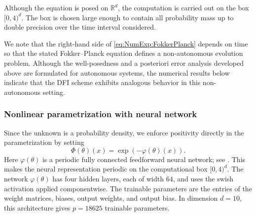 \documentclass[oneside,11pt]{article}
\theoremstyle{remark}
\theoremstyle{thmstyleone}
\theoremstyle{thmstylethree}
\theoremstyle{thmstyletwo}
\newcommand{\R}{\mathbb{R}}
\begin{document}
Although the equation is posed on $\R^d$, the computation is carried out on the box $[0,4)^d$. The box is chosen large enough to contain all probability mass up to double precision over the time interval considered.

We note that the right-hand side of \eqref{eq:NumExp:FokkerPlanck} depends on time so that the stated Fokker--Planck equation defines a non-autonomous evolution problem. Although the well-posedness and a posteriori error analysis developed above are formulated for autonomous systems, the numerical results below indicate that the DFI scheme exhibits analogous behavior in this non-autonomous setting.

\subsubsection{Nonlinear parametrization with neural network}
Since the unknown is a probability density, we enforce positivity directly in the parametrization by setting
\begin{equation*}
    \Phi(\theta)(x)=\exp(-\varphi(\theta)(x)).
\end{equation*}
Here $\varphi(\theta)$ is a periodic fully connected feedforward neural network; see . This makes the neural representation periodic on the computational box $[0,4)^d$. The network $\varphi(\theta)$ has four hidden layers, each of width $64$, and
uses the swish activation applied componentwise. The trainable parameters are the entries of the weight matrices, biases, output weights, and output bias. In dimension $d=10$, this architecture gives $p = 18625$ trainable parameters.
\end{document}
